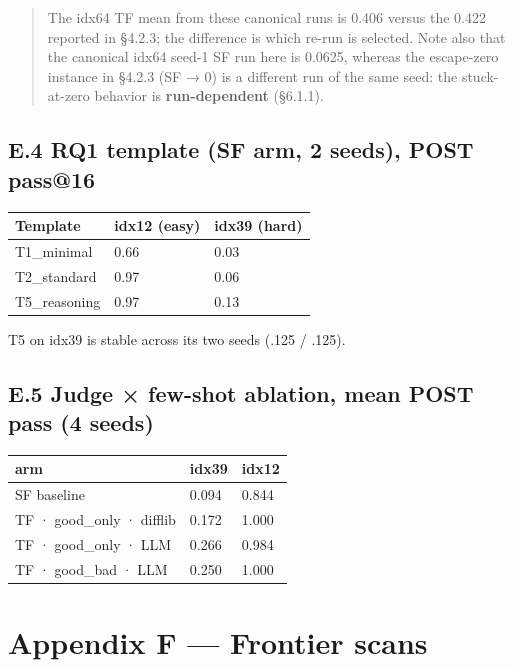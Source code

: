\begin{quote}
The idx64 TF mean from these canonical runs is 0.406 versus the 0.422 reported in §4.2.3; the difference is which re-run is selected. Note also that the canonical idx64 seed-1 SF run here is 0.0625, whereas the escape-zero instance in §4.2.3 (SF → 0) is a different run of the same seed: the stuck-at-zero behavior is \textbf{run-dependent} (§6.1.1).
\end{quote}

\subsection{E.4 RQ1 template (SF arm, 2 seeds), POST pass@16}\label{e.4-rq1-template-sf-arm-2-seeds-post-pass16}

\begin{longtable}[]{@{}lll@{}}
\toprule\noalign{}
Template & idx12 (easy) & idx39 (hard) \\
\midrule\noalign{}
\endhead
\bottomrule\noalign{}
\endlastfoot
T1\_minimal & 0.66 & 0.03 \\
T2\_standard & 0.97 & 0.06 \\
T5\_reasoning & 0.97 & 0.13 \\
\end{longtable}

T5 on idx39 is stable across its two seeds (.125 / .125).

\subsection{E.5 Judge × few-shot ablation, mean POST pass (4 seeds)}\label{e.5-judge-few-shot-ablation-mean-post-pass-4-seeds}

\begin{longtable}[]{@{}lll@{}}
\toprule\noalign{}
arm & idx39 & idx12 \\
\midrule\noalign{}
\endhead
\bottomrule\noalign{}
\endlastfoot
SF baseline & 0.094 & 0.844 \\
TF · good\_only · difflib & 0.172 & 1.000 \\
TF · good\_only · LLM & 0.266 & 0.984 \\
TF · good\_bad · LLM & 0.250 & 1.000 \\
\end{longtable}

\section{Appendix F --- Frontier scans}\label{appendix-f-frontier-scans}

